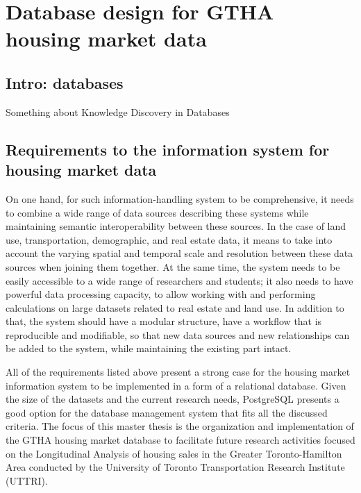 \chapter{Database design for GTHA housing market data} \label{ch:rdbms_design}

\section{Intro: databases} \label{sec:intro_database_design}

Something about Knowledge Discovery in Databases

\section{Requirements to the information system for housing market data} \label{sec:requirements_to_information_system}

On one hand, for such information-handling system to be comprehensive, it needs to combine a wide range of data sources describing these systems while maintaining semantic interoperability between these sources.
In the case of land use, transportation, demographic, and real estate data, it means to take into account the varying spatial and temporal scale and resolution between these data sources when joining them together.
At the same time, the system needs to be easily accessible to a wide range of researchers and students;
it also needs to have powerful data processing capacity, to allow working with and performing calculations on large datasets related to real estate and land use.
In addition to that, the system should have a modular structure, have a workflow that is reproducible and modifiable, so that new data sources and new relationships can be added to the system, while maintaining the existing part intact.

All of the requirements listed above present a strong case for the housing market information system to be implemented in a form of a relational database.
Given the size of the datasets and the current research needs, PostgreSQL presents a good option for the database management system that fits all the discussed criteria.
The focus of this master thesis is the organization and implementation of the GTHA housing market database to facilitate future research activities focused on the Longitudinal Analysis of housing sales in the Greater Toronto-Hamilton Area conducted by the University of Toronto Transportation Research Institute (UTTRI).

